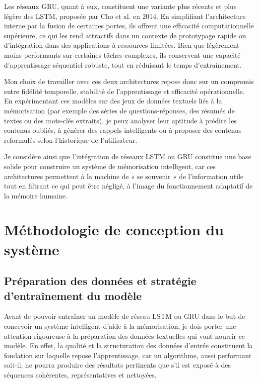 \documentclass[11pt,a4paper]{report}
\begin{document}
Les réseaux GRU, quant à eux, constituent une variante plus récente et plus légère des LSTM, proposée par Cho et al. en 2014. En simplifiant l’architecture interne par la fusion de certaines portes, ils offrent une efficacité computationnelle supérieure, ce qui les rend attractifs dans un contexte de prototypage rapide ou d’intégration dans des applications à ressources limitées. Bien que légèrement moins performants sur certaines tâches complexes, ils conservent une capacité d’apprentissage séquentiel robuste, tout en réduisant le temps d’entraînement.

Mon choix de travailler avec ces deux architectures repose donc sur un compromis entre fidélité temporelle, stabilité de l’apprentissage et efficacité opérationnelle. En expérimentant ces modèles sur des jeux de données textuels liés à la mémorisation (par exemple des séries de questions-réponses, des résumés de textes ou des mots-clés extraits), je peux analyser leur aptitude à prédire les contenus oubliés, à générer des rappels intelligents ou à proposer des contenus reformulés selon l’historique de l’utilisateur.

Je considère ainsi que l’intégration de réseaux LSTM ou GRU constitue une base solide pour construire un système de mémorisation intelligent, car ces architectures permettent à la machine de « se souvenir » de l’information utile tout en filtrant ce qui peut être négligé, à l’image du fonctionnement adaptatif de la mémoire humaine.

\section{Méthodologie de conception du système}

\subsection{Préparation des données et stratégie d’entraînement du modèle}

Avant de pouvoir entraîner un modèle de réseau LSTM ou GRU dans le but de concevoir un système intelligent d’aide à la mémorisation, je dois porter une attention rigoureuse à la préparation des données textuelles qui vont nourrir ce modèle. En effet, la qualité et la structuration des données d’entrée constituent la fondation sur laquelle repose l’apprentissage, car un algorithme, aussi performant soit-il, ne pourra produire des résultats pertinents que s’il est exposé à des séquences cohérentes, représentatives et nettoyées.
\end{document}
